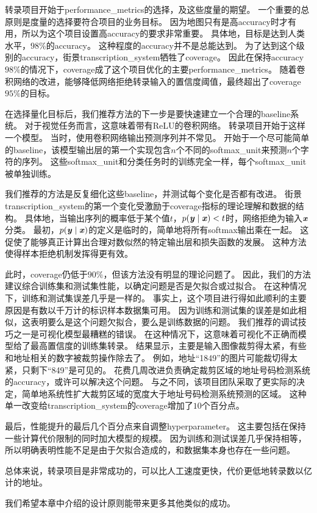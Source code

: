 转录项目开始于\gls{performance_metrics}的选择，及这些度量的期望。
一个重要的总原则是度量的选择要符合项目的业务目标。
因为地图只有是高\gls{accuracy}时才有用，所以为这个项目设置高\gls{accuracy}的要求非常重要。
具体地，目标是达到人类水平，$98\%$的\gls{accuracy}。
这种程度的\gls{accuracy}并不是总能达到。
为了达到这个级别的\gls{accuracy}，街景\gls{transcription_system}牺牲了\gls{coverage}。
因此在保持\gls{accuracy}$98\%$的情况下，\gls{coverage}成了这个项目优化的主要\gls{performance_metrics}。
随着卷积网络的改进，能够降低网络拒绝转录输入的置信度阈值，最终超出了\gls{coverage}$95\%$的目标。


在选择量化目标后，我们推荐方法的下一步是要快速建立一个合理的\gls{baseline}系统。
对于视觉任务而言，这意味着带有\gls{ReLU}的卷积网络。
转录项目开始于这样一个模型。
当时，使用卷积网络输出预测序列并不常见。
开始于一个尽可能简单的\gls{baseline}，该模型输出层的第一个实现包含$n$个不同的\gls{softmax_unit}来预测$n$个字符的序列。
这些\gls{softmax_unit}和分类任务时的训练完全一样，每个\gls{softmax_unit}被单独训练。


我们推荐的方法是反复细化这些\gls{baseline}，并测试每个变化是否都有改进。
街景\gls{transcription_system}的第一个变化受激励于\gls{coverage}指标的理论理解和数据的结构。
具体地，当输出序列的概率低于某个值$t$，$p(\boldsymbol{\mathit{y}}\mid\boldsymbol{\mathit{x}}) < t$时，网络拒绝为输入$\boldsymbol{\mathit{x}}$分类。
最初，$p(\boldsymbol{\mathit{y}}\mid\boldsymbol{\mathit{x}})$的定义是临时的，简单地将所有\gls{softmax}输出乘在一起。
这促使了能够真正计算出合理对数似然的特定输出层和损失函数的发展。
这种方法使得样本拒绝机制发挥得更有效。


此时，\gls{coverage}仍低于$90\%$，但该方法没有明显的理论问题了。
因此，我们的方法建议综合训练集和测试集性能，以确定问题是否是欠拟合或过拟合。
在这种情况下，训练和测试集误差几乎是一样的。
事实上，这个项目进行得如此顺利的主要原因是有数以千万计的标识样本数据集可用。
因为训练和测试集的误差是如此相似，这表明要么是这个问题欠拟合，要么是训练数据的问题。
我们推荐的调试技巧之一是可视化模型最糟糕的错误。
在这种情况下，这意味着可视化不正确而模型给了最高置信度的训练集转录。
结果显示，主要是输入图像裁剪得太紧，有些和地址相关的数字被裁剪操作除去了。
例如，地址``1849''的图片可能裁切得太紧，只剩下``849''是可见的。
花费几周改进负责确定裁剪区域的地址号码检测系统的\gls{accuracy}，或许可以解决这个问题。
与之不同，该项目团队采取了更实际的决定，简单地系统性扩大裁剪区域的宽度大于地址号码检测系统预测的区域。
这种单一改变给\gls{transcription_system}的\gls{coverage}增加了$10$个百分点。


最后，性能提升的最后几个百分点来自调整\gls{hyperparameter}。
这主要包括在保持一些计算代价限制的同时加大模型的规模。
因为训练和测试误差几乎保持相等，所以明确表明性能不足是由于欠拟合造成的，和数据集本身也存在一些问题。


总体来说，转录项目是非常成功的，可以比人工速度更快，代价更低地转录数以亿计的地址。

我们希望本章中介绍的设计原则能带来更多其他类似的成功。

